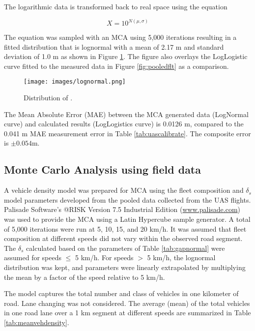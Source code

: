 The logarithmic data is transformed back to real space using the equation

\begin{equation}
\label{inverse-10}
X = 10^{N(\mu,\sigma)}
\end{equation}

The equation was sampled with an MCA using 5,000 iterations resulting in a fitted distribution that is lognormal with a mean of 2.17 m and standard deviation of 1.0 m as shown in Figure \ref{fig:lognormal}.  The figure also overlays the LogLogistic curve fitted to the measured data in Figure \ref{fig:pooledflt} as a comparison.
 
\begin{figure}[H]
\centering
\texttt{[image: images/lognormal.png]} 
\caption{Distribution of .}
\label{fig:lognormal}
\end{figure}

The Mean Absolute Error (MAE) between the MCA generated data (LogNormal curve) and calculated results (LogLogistics curve) is 0.0126 m, compared to the 0.041 m MAE measurement error in Table \ref{tab:uascalibrate}. The composite error is $\pm 0.054$m.


\subsection{Monte Carlo Analysis using field data}
A vehicle density model was prepared for MCA using the fleet composition and $\delta_{s}$ model parameters developed from the pooled data collected from the UAS flights. Palisade Software’s @RISK Version 7.5 Industrial Edition (\url{www.palisade.com}) was used to provide the MCA using a Latin Hypercube sample generator.  A total of 5,000 iterations were run at 5, 10, 15, and 20 km/h. It was assumed that fleet composition at different speeds did not vary within the observed road segment. The $\delta_{s}$ calculated based on the parameters of Table \ref{tab:gapnormal} were assumed for speeds $\leq$ 5 km/h. For speeds $>$ 5 km/h, the lognormal distribution was kept, and parameters were linearly extrapolated by multiplying the mean by a factor of the speed relative to 5 km/h.  

The model captures the total number and class of vehicles in one kilometer of road.  Lane changing was not considered. The average (mean) of the total vehicles in one road lane over a 1 km segment at different speeds are summarized in Table \ref{tab:meanvehdensity}.

